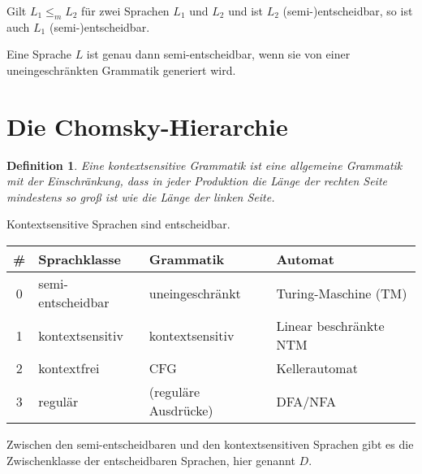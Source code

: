 \documentclass{cheat-sheet}
\newtheorem*{definition}{Definition}
\begin{document}
\fbox{
  \begin{minipage}{8.5cm}
    \hfill\vspace{2.5cm}
  \end{minipage}
}

\begin{satz}
Gilt $L_{1} \le_{m} L_{2}$ für zwei Sprachen $L_{1}$ und $L_{2}$ und ist $L_{2}$ (semi-)entscheidbar, so ist auch $L_{1}$ (semi-)entscheidbar.
\end{satz}

\begin{satz}
Eine Sprache $L$ ist genau dann semi-entscheidbar, wenn sie von einer uneingeschränkten Grammatik generiert wird.
\end{satz}


\section{Die Chomsky-Hierarchie}

\begin{definition}
Eine \emph{kontextsensitive Grammatik} ist eine allgemeine Grammatik mit der Einschränkung, dass in jeder Produktion die Länge der rechten Seite mindestens so groß ist wie die Länge der linken Seite.
\end{definition}

\begin{satz}
Kontextsensitive Sprachen sind entscheidbar.
\end{satz}

\begin{center}
  \scriptsize
  \setlength{\tabcolsep}{2pt}
  \begin{tabular}{ c | l | l | l }
    \# & Sprachklasse & Grammatik & Automat \\
    \hline
    0 & semi-entscheidbar & uneingeschränkt & Turing-Maschine (TM) \\
    1 & kontextsensitiv & kontextsensitiv & Linear beschränkte NTM \\
    2 & kontextfrei & CFG & Kellerautomat \\
    3 & regulär & (reguläre Ausdrücke) & DFA/NFA
  \end{tabular}
\end{center}

\begin{bem}
  Zwischen den semi-entscheidbaren und den kontextsensitiven Sprachen gibt es die Zwischenklasse der entscheidbaren Sprachen, hier genannt $D$.
\end{bem}
\end{document}
